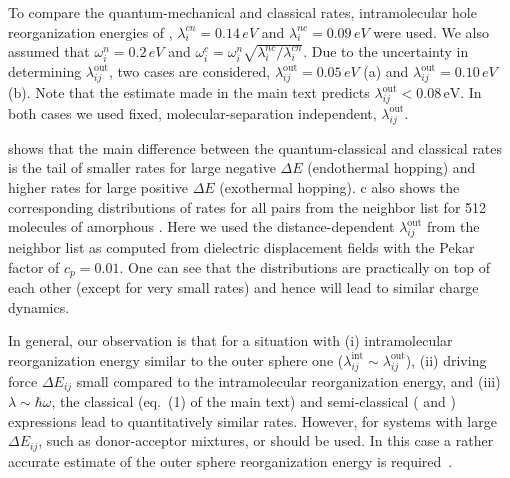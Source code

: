 To compare the quantum-mechanical and classical rates, intramolecular hole reorganization energies of \Alq, $\lambda^{cn}_i=0.14\,\unit{eV}$ and $\lambda^{nc}_i=0.09\,\unit{eV}$ were used. We also assumed that $\omega_i^n=0.2\,\unit{eV}$ and $\omega_i^c=\omega_i^n\sqrt{\lambda^{nc}_i / \lambda^{cn}_i}$. Due to the uncertainty in determining $\lambda_{ij}^\text{out}$, two cases are considered, $\lambda_{ij}^\text{out}=0.05\,\unit{eV}$ (a) and $\lambda_{ij}^\text{out}=0.10\,\unit{eV}$ (b). Note that the estimate made in the main text predicts $\lambda_{ij}^\text{out} < 0.08\,\text{eV}$. In both cases we used fixed, molecular-separation independent, $\lambda_{ij}^\text{out}$. 

 shows that the main difference between the quantum-classical and classical rates is the tail of smaller rates for large negative $\Delta E$ (endothermal hopping) and higher rates for large positive $\Delta E$ (exothermal hopping).  c also shows the corresponding distributions of rates for all pairs from the neighbor list for 512 molecules of  amorphous \Alq. Here we used the distance-dependent $\lambda_{ij}^\text{out}$ from the neighbor list as computed from dielectric displacement fields with the Pekar factor of $c_p=0.01$. One can see that the distributions are practically on top of each other (except for very small rates) and hence will lead to similar charge dynamics. 

In general, our observation is that for a situation with (i) intramolecular reorganization energy similar to the outer sphere one ($\lambda_{ij}^\text{int} \sim \lambda_{ij}^\text{out}$), (ii) driving force $\Delta E_{ij}$ small compared to the intramolecular reorganization energy, and (iii) $\lambda \sim \hbar \omega$, the classical (eq.~(1) of the main text) and semi-classical  ( and ) expressions lead to quantitatively similar rates.
However, for systems with large $\Delta E_{ij}$, such as donor-acceptor mixtures,  or  should be used. In this case a rather accurate estimate of the outer sphere reorganization energy is required~\cite{mcmahon_evaluation_2010}.

